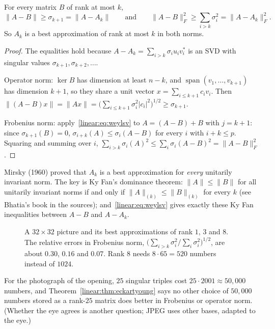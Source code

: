 \begin{theorem}\label{linear:thm:eckartyoung}
For every matrix $B$ of rank at most $k$,
\[
\|A-B\|\ge\sigma_{k+1}=\|A-A_k\|\qquad\text{and}\qquad\|A-B\|_F^2\ge\sum_{i>k}\sigma_i^2=\|A-A_k\|_F^2.
\]
So $A_k$ is a best approximation of rank at most $k$ in both norms.
\end{theorem}
\begin{proof}
The equalities hold because $A-A_k=\sum_{i>k}\sigma_iu_iv_i^*$ is an SVD with singular values $\sigma_{k+1},\sigma_{k+2},\dots$.

Operator norm: $\ker B$ has dimension at least $n-k$, and $\operatorname{span}(v_1,\dots,v_{k+1})$ has dimension $k+1$, so they
share a unit vector $x=\sum_{i\le k+1}c_iv_i$. Then $\|(A-B)x\|=\|Ax\|=\bigl(\sum_{i\le k+1}\sigma_i^2|c_i|^2\bigr)^{1/2}\ge
\sigma_{k+1}$.

Frobenius norm: apply~\eqref{linear:eq:weylsv} to $A=(A-B)+B$ with $j=k+1$: since $\sigma_{k+1}(B)=0$,
$\sigma_{i+k}(A)\le\sigma_i(A-B)$ for every $i$ with $i+k\le p$. Squaring and summing over $i$,
$\sum_{i>k}\sigma_i(A)^2\le\sum_i\sigma_i(A-B)^2=\|A-B\|_F^2$.
\end{proof}

\begin{remark}
Mirsky (1960) proved that $A_k$ is a best approximation for \emph{every} unitarily invariant norm. The key is Ky Fan's
dominance theorem: $\|A\|\le\|B\|$ for all unitarily invariant norms if and only if $\|A\|_{(k)}\le\|B\|_{(k)}$ for every $k$
(see Bhatia's book in the sources); and~\eqref{linear:eq:weylsv} gives exactly these Ky Fan inequalities between $A-B$ and
$A-A_k$.
\end{remark}

\begin{figure}[ht]
\centering
{}
\caption{A $32\times32$ picture and its best approximations of rank $1$, $3$ and $8$. The relative errors in Frobenius norm,
$\bigl(\sum_{i>k}\sigma_i^2/\sum_i\sigma_i^2\bigr)^{1/2}$, are about $0.30$, $0.16$ and $0.07$. Rank $8$ needs $8\cdot65=520$
numbers instead of $1024$.}
\label{linear:fig:lowrank}
\end{figure}

For the photograph of the opening, $25$ singular triples cost $25\cdot2001\approx50{,}000$ numbers, and
Theorem~\ref{linear:thm:eckartyoung} says no other choice of $50{,}000$ numbers stored as a rank-$25$ matrix does better in
Frobenius or operator norm. (Whether the eye agrees is another question; JPEG uses other bases, adapted to the eye.)

